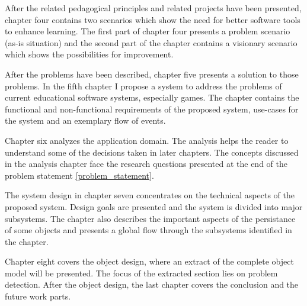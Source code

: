 After the related pedagogical principles and related projects have been presented, chapter
four contains two scenarios which show the need for better software tools to enhance
learning. The first part of chapter four presents a problem scenario (as-is situation)
and the second part of the chapter contains a visionary scenario which shows the
possibilities for improvement.

After the problems have been described, chapter five presents a solution to those problems.
In the fifth chapter I propose a system to address the problems of current educational
software systems, especially games. The chapter contains the functional and
non-functional requirements of the proposed system, use-cases for the system and
an exemplary flow of events.

Chapter six analyzes the application domain. The analysis helps the reader to understand
some of the decisions taken in later chapters. The concepts discussed in the analysis
chapter face the research questions presented at the end of the problem statement
\ref{problem_statement}.

The system design in chapter seven concentrates on the technical aspects of the
proposed system. Design goals are presented and the system is divided into major
subsystems. The chapter also describes the important aspects of the persistance
of some objects and presents a global flow through the subsystems identified in the
chapter.

Chapter eight covers the object design, where an extract of the complete
object model will be presented. The focus of the extracted section lies on
problem detection. After the object design, the last chapter covers the
conclusion and the future work parts.
